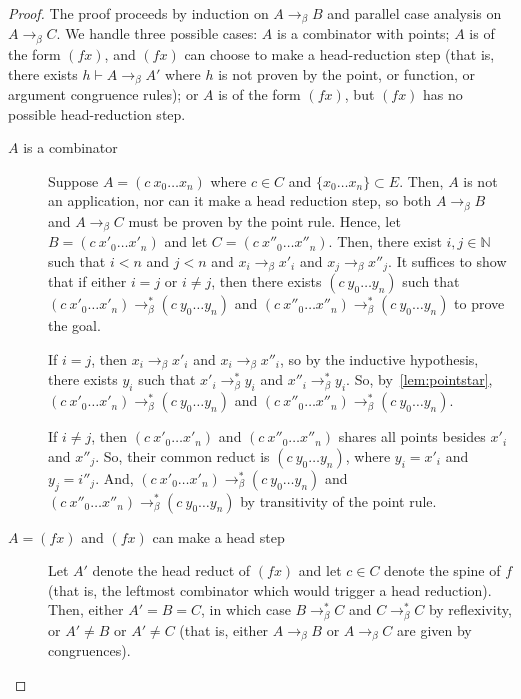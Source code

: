 \documentclass{lmcs}
\newcommand{\arr}{\rightarrow}
\newcommand{\barr}{\arr_{\beta}}
\begin{document}
\begin{proof}
  The proof proceeds by induction on \(A \barr B\) and parallel case analysis on \(A \barr C\). We handle three possible cases: \(A\) is a combinator with points; \(A\) is of the form \((f x)\), and \((f x)\) can choose to make a head-reduction step (that is, there exists \(h \vdash A \barr A'\) where \(h\) is not proven by the point, or function, or argument congruence rules); or \(A\) is of the form \((f x)\), but \((f x)\) has no possible head-reduction step.

  \begin{description}
  \item[\(A\) is a combinator] Suppose \(A = (c\ x_0 \ldots x_n)\) where \(c \in C\) and \(\{x_0 \ldots x_n\} \subset E\). Then, \(A\) is not an application, nor can it make a head reduction step, so both \(A \barr B\) and \(A \barr C\) must be proven by the point rule. Hence, let \(B = (c\ x'_0 \ldots x'_n)\) and let \(C = (c\ x''_0 \ldots x''_n)\). Then, there exist \(i, j \in \mathbb{N}\) such that \(i < n\) and \(j < n\) and \(x_i \barr x'_i\) and \(x_j \barr x''_j\). It suffices to show that if either \(i = j\) or \(i \neq j\), then there exists \((c\ y_0 \ldots y_n)\) such that \((c\ x'_0 \ldots x'_n) \barr^{*} (c\ y_0 \ldots y_n)\) and \((c\ x''_0 \ldots x''_n) \barr^{*} (c\ y_0 \ldots y_n)\) to prove the goal.

    If \(i = j\), then \(x_i \barr x'_i\) and \(x_i \barr x''_i\), so by the inductive hypothesis, there exists \(y_i\) such that \(x'_i \barr^{*} y_i\) and \(x''_i \barr^{*} y_i\). So, by~\ref{lem:pointstar}, \((c\ x'_0 \ldots x'_n) \barr^{*} (c\ y_0 \ldots y_n)\) and \((c\ x''_0 \ldots x''_n) \barr^{*} (c\ y_0 \ldots y_n)\).

    If \(i \neq j\), then \((c\ x'_0 \ldots x'_n)\) and \((c\ x''_0 \ldots x''_n)\) shares all points besides \(x'_i\) and \(x''_j\). So, their common reduct is \((c\ y_0 \ldots y_n)\), where \(y_i = x'_i\) and \(y_j = i''_j\). And, \((c\ x'_0 \ldots x'_n) \barr^{*} (c\ y_0 \ldots y_n)\) and \((c\ x''_0 \ldots x''_n) \barr^{*} (c\ y_0 \ldots y_n)\) by transitivity of the point rule.
  \item[\(A = (f x)\) and \((f x)\) can make a head step] Let \(A'\) denote the head reduct of \((f x)\) and let \(c \in C\) denote the spine of \(f\) (that is, the leftmost combinator which would trigger a head reduction). Then, either \(A' = B = C\), in which case \(B \barr^{*} C\) and \(C \barr^{*} C\) by reflexivity, or \(A' \neq B\) or \(A' \neq C\) (that is, either \(A \barr B\) or \(A \barr C\) are given by congruences).\\


\end{description}
\end{proof}
\end{document}
